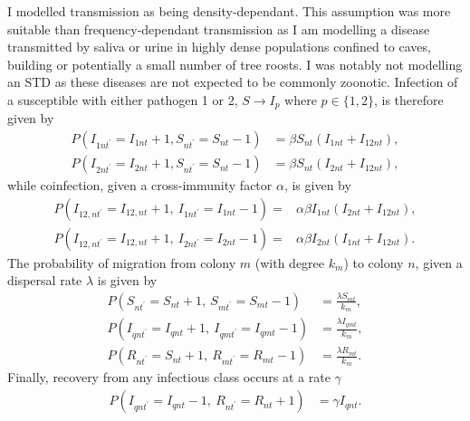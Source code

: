 I modelled transmission as being density-dependant.
This assumption was more suitable than frequency-dependant transmission as I am modelling a disease transmitted by saliva or urine in highly dense populations confined to caves, building or potentially a small number of tree roosts.
I was notably not modelling an STD as these diseases are not expected to be commonly zoonotic.
Infection of a susceptible with either pathogen 1 or 2, $S \rightarrow I_p$ where $p\in \{1,2\}$, is therefore given by
\begin{align}
  P\left( I_{1nt^\prime} = I_{1nt}+1, S_{nt^\prime} = S_{nt}-1 \right) &= \beta S_{nt}\left(I_{1nt} + I_{12nt}\right),\\
  P\left( I_{2nt^\prime} = I_{2nt}+1, S_{nt^\prime} = S_{nt}-1 \right) &= \beta S_{nt}\left(I_{2nt} + I_{12nt}\right),
\end{align}
while coinfection, given a cross-immunity factor $\alpha$, is given by
\begin{align}
  P\left( I_{12,nt^\prime} = I_{12,nt}+1,\: I_{1nt^\prime} = I_{1nt}-1\right) = &\alpha\beta I_{1nt}\left(I_{2nt} + I_{12nt}\right),\\
  P\left( I_{12,nt^\prime} = I_{12,nt}+1,\: I_{2nt^\prime} = I_{2nt}-1\right) = &\alpha\beta I_{2nt}\left(I_{1nt} + I_{12nt}\right).
\end{align}
The probability of migration from colony $m$ (with degree $k_m$) to colony $n$, given a dispersal rate $\lambda$ is given by
\begin{align}
  P\left(S_{nt^\prime}=S_{nt}+1,\: S_{mt^\prime} = S_{mt}-1\right) &= \frac{\lambda S_{mt}}{k_m},\\
  P\left(I_{qnt^\prime}=I_{qnt}+1,\: I_{qmt^\prime} = I_{qmt}-1\right) &= \frac{\lambda I_{qmt}}{k_m},\\
  P\left(R_{nt^\prime}=S_{nt}+1,\: R_{mt^\prime} = R_{mt}-1\right) &= \frac{\lambda R_{mt}}{k_m}.
\end{align}
Finally, recovery from any infectious class occurs at a rate $\gamma$
\begin{align}
  P\left( I_{qnt^\prime} = I_{qnt}-1,\: R_{nt^\prime} = R_{nt}+1 \right) &= \gamma I_{qnt}.
\end{align}


